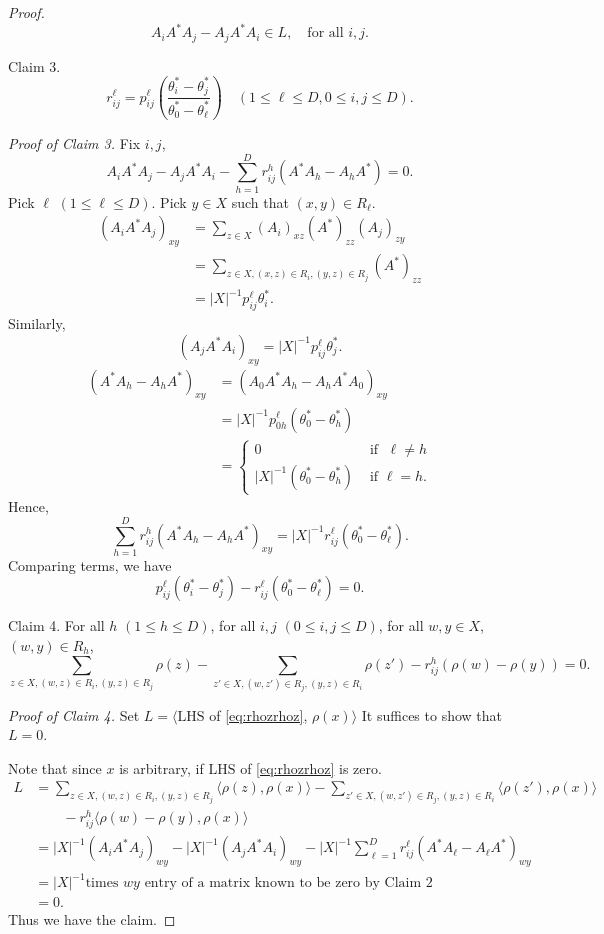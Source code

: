 \documentclass[
]{book}
\theoremstyle{definition}
\theoremstyle{definition}
\theoremstyle{definition}
\theoremstyle{definition}
\theoremstyle{remark}
\begin{document}
\begin{proof}
\[A_iA^*A_j - A_jA^*A_i\in L, \quad \text{for all $i,j$}.\]

Claim 3.
\[r^\ell_{ij} = p^\ell_{ij}\left(\frac{\theta^*_i-\theta^*_j}{\theta^*_0 - \theta^*_\ell}\right)\quad (1\leq \ell\leq D, 0\leq i,j\leq D).\]

\emph{Proof of Claim 3.}
Fix \(i,j\),
\[A_iA^*A_j - A_jA^*A_i - \sum_{h=1}^D r^h_{ij}(A^*A_h - A_hA^*) = 0.\]
Pick \(\ell\) \((1\leq \ell \leq D)\). Pick \(y\in X\) such that \((x,y)\in R_\ell\).
\begin{align}
(A_iA^*A_j)_{xy} & = \sum_{z\in X}(A_i)_{xz}(A^*)_{zz}(A_j)_{zy}\\
& = \sum_{z\in X, (x,z)\in R_i, (y,z)\in R_j}(A^*)_{zz}\\
& = |X|^{-1}p^\ell_{ij}\theta^*_i.
\end{align}
Similarly,
\[(A_jA^*A_i)_{xy} = |X|^{-1}p^\ell_{ij}\theta^*_j.\]
\begin{align}
(A^*A_h-A_hA^*)_{xy} & = (A_0A^*A_h - A_hA^*A_0)_{xy}\\
& = |X|^{-1}p^\ell_{0h}(\theta^*_0 - \theta^*_h)\\
& = \begin{cases}
0 & \text{ if }\; \ell \neq h\\
|X|^{-1}(\theta^*_0-\theta^*_h) & \text{ if } \ell = h.
\end{cases}
\end{align}
Hence,
\[\sum_{h=1}^D r^h_{ij}(A^*A_h - A_hA^*)_{xy} = |X|^{-1}r^\ell_{ij}(\theta^*_0-\theta^*_\ell).\]
Comparing terms, we have
\[p^\ell_{ij}(\theta^*_i-\theta^*_j) - r^\ell_{ij}(\theta^*_0-\theta^*_\ell) = 0.\]

Claim 4. For all \(h\) \((1\leq h\leq D)\), for all \(i,j\) \((0\leq i,j\leq D)\), for all \(w,y\in X\), \((w,y)\in R_h\),
\begin{equation}
\sum_{z\in X,(w,z)\in R_i, (y,z)\in R_j}\rho(z)-\sum_{z'\in X, (w,z')\in R_j, (y,z)\in R_i}\rho(z') - r^h_{ij}(\rho(w)-\rho(y))=0. \label{eq:rhozrhoz}
\end{equation}

\emph{Proof of Claim 4.}
Set \(L = \langle \mathrm{LHS}\) of \eqref{eq:rhozrhoz}, \(\rho(x)\rangle\)
It suffices to show that \(L = 0\).

Note that since \(x\) is arbitrary, if \(\mathrm{LHS}\) of \eqref{eq:rhozrhoz} is zero.
\begin{align}
L & = \sum_{z\in X,(w,z)\in R_i, (y,z)\in R_j}\langle \rho(z), \rho(x)\rangle -\sum_{z'\in X, (w,z')\in R_j, (y,z)\in R_i}\langle\rho(z'),\rho(x)\rangle \\
& \qquad - r^h_{ij}\langle \rho(w)-\rho(y), \rho(x)\rangle\\
& = |X|^{-1}(A_iA^*A_j)_{wy} - |X|^{-1}(A_jA^*A_i)_{wy}-|X|^{-1}\sum_{\ell=1}^Dr^\ell_{ij}(A^*A_\ell - A_\ell A^*)_{wy}\\
& = |X|^{-1} \text{times $wy$ entry of a matrix known to be zero by Claim 2}\\
& = 0.
\end{align}
Thus we have the claim.

\end{proof}
\end{document}
